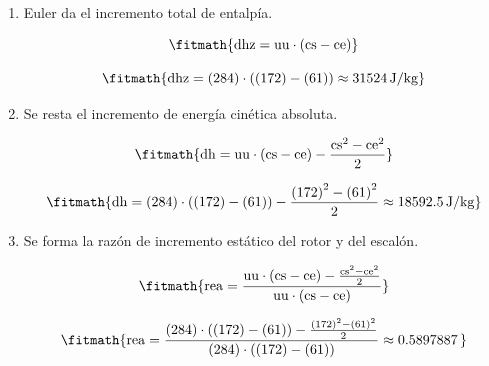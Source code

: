 \begin{enumerate}

\item Euler da el incremento total de entalpía.

\[\fitmath{\mathrm{dhz}=\mathrm{uu}\cdot \left(\mathrm{cs}-\mathrm{ce}\right)}\]

\[\fitmath{\mathrm{dhz}=(284)\cdot \left((172)-(61)\right)\approx 31524\,\mathrm{J/kg}}\]

\item Se resta el incremento de energía cinética absoluta.

\[\fitmath{\mathrm{dh}=\mathrm{uu}\cdot \left(\mathrm{cs}-\mathrm{ce}\right)-\frac{{\mathrm{cs}}^{2}-{\mathrm{ce}}^{2}}{2}}\]

\[\fitmath{\mathrm{dh}=(284)\cdot \left((172)-(61)\right)-\frac{{(172)}^{2}-{(61)}^{2}}{2}\approx 18592.5\,\mathrm{J/kg}}\]

\item Se forma la razón de incremento estático del rotor y del escalón.

\[\fitmath{\mathrm{rea}=\frac{\mathrm{uu}\cdot \left(\mathrm{cs}-\mathrm{ce}\right)-\frac{{\mathrm{cs}}^{2}-{\mathrm{ce}}^{2}}{2}}{\mathrm{uu}\cdot \left(\mathrm{cs}-\mathrm{ce}\right)}}\]

\[\fitmath{\mathrm{rea}=\frac{(284)\cdot \left((172)-(61)\right)-\frac{{(172)}^{2}-{(61)}^{2}}{2}}{(284)\cdot \left((172)-(61)\right)}\approx 0.5897887\,}\]

\end{enumerate}
